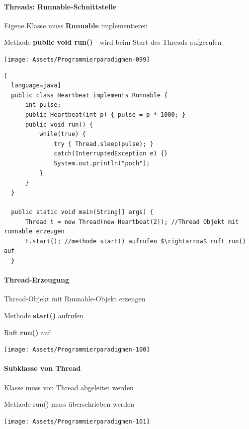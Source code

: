 \documentclass[10pt]{article}
\begin{document}
  \paragraph{Threads: Runnable-Schnittstelle}
  Eigene Klasse muss \textbf{Runnable} implementieren
  \begin{itemize*}
    \item Methode \textbf{public void run()} - wird beim Start des Threads aufgerufen
  \end{itemize*}
  \begin{center}
    \texttt{[image: Assets/Programmierparadigmen-099]}
  \end{center}
  \begin{lstlisting}[
  language=java]
  public class Heartbeat implements Runnable {
      int pulse;
      public Heartbeat(int p) { pulse = p * 1000; }
      public void run() {
          while(true) {
              try { Thread.sleep(pulse); }
              catch(InterruptedException e) {}
              System.out.println("poch");
          }
      }
  }

  public static void main(String[] args) {
      Thread t = new Thread(new Heartbeat(2)); //Thread Objekt mit runnable erzeugen
      t.start(); //methode start() aufrufen $\rightarrow$ ruft run() auf
  }
\end{lstlisting}
  
  \paragraph{Thread-Erzeugung}
  
  \begin{itemize*}
    \item Thread-Objekt mit Runnable-Objekt erzeugen
    \item Methode \textbf{start()} aufrufen
    \begin{itemize*}
      \item Ruft \textbf{run()} auf
    \end{itemize*}
  \end{itemize*}
  \begin{center}
    \texttt{[image: Assets/Programmierparadigmen-100]}
  \end{center}
  
  \paragraph{Subklasse von Thread}
  
  \begin{itemize*}
    \item Klasse muss von Thread abgeleitet werden
    \item Methode run() muss überschrieben werden
  \end{itemize*}
  \begin{center}
    \texttt{[image: Assets/Programmierparadigmen-101]}
  \end{center}
  
\end{document}
